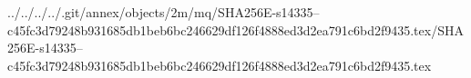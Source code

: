 ../../../../.git/annex/objects/2m/mq/SHA256E-s14335--c45fc3d79248b931685db1beb6bc246629df126f4888ed3d2ea791c6bd2f9435.tex/SHA256E-s14335--c45fc3d79248b931685db1beb6bc246629df126f4888ed3d2ea791c6bd2f9435.tex